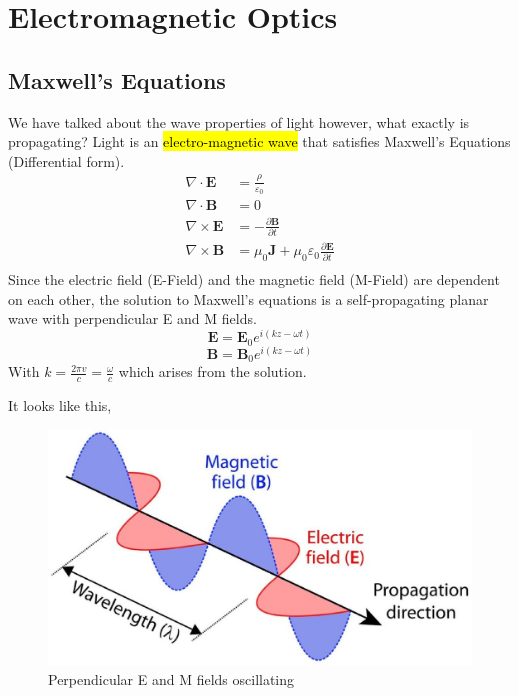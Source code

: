 \documentclass{article}
\begin{document}
\section{Electromagnetic Optics}
\subsection{Maxwell's Equations}
We have talked about the wave properties of light however, what exactly is propagating?
Light is an \hl{electro-magnetic wave} that satisfies Maxwell's Equations (Differential form).
\begin{equation}
    \begin{aligned}
        \nabla \cdot \mathbf{E} &= \frac {\rho} {\varepsilon_0} \\
        \nabla \cdot \mathbf{B} &= 0 \\
        \nabla \times \mathbf{E} &= -\frac{\partial \mathbf{B}} {\partial t} \\
        \nabla \times \mathbf{B} &= \mu_0 \mathbf{J} + \mu_0 \varepsilon_0 \frac{\partial \mathbf{E}} {\partial t} \\
    \end{aligned}
\end{equation}
Since the electric field (E-Field) and the magnetic field (M-Field) are dependent on each other, the solution to Maxwell's equations is a self-propagating planar wave with perpendicular E and M fields.
\begin{equation}
    \textbf{E} = \textbf{E}_0e^{i(kz - \omega t)}
\end{equation}
\begin{equation}
    \textbf{B} = \textbf{B}_0e^{i(kz - \omega t)}
\end{equation}
With $k = \frac{2\pi v}{c} = \frac{\omega}{c}$ which arises from the solution.

It looks like this,
\begin{figure}[!phtb]
    \centering
    \includegraphics[width=0.6\linewidth]{img/EM_Wave.eps}
    \caption{Perpendicular E and M fields oscillating}
    \label{fig:EM_Wave}
\end{figure}
\end{document}
